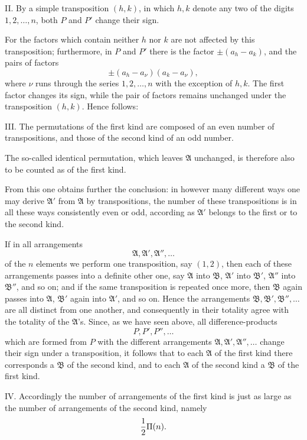 \documentclass[11pt]{article}
\begin{document}
II. By a simple transposition \((h,k)\), in which \(h,k\) denote any two of the digits \(1,2,\ldots,n\), both \(P\) and \(P'\) change their sign.

For the factors which contain neither \(h\) nor \(k\) are not affected by this transposition; furthermore, in \(P\) and \(P'\) there is the factor \(\pm(a_h-a_k)\), and the pairs of factors
\[
 \pm(a_h-a_\nu)(a_k-a_\nu),
\]
where \(\nu\) runs through the series \(1,2,\ldots,n\) with the exception of \(h,k\). The first factor changes its sign, while the pair of factors remains unchanged under the transposition \((h,k)\). Hence follows:

III. The permutations of the first kind are composed of an even number of transpositions, and those of the second kind of an odd number.

The so-called identical permutation, which leaves \(\mathfrak A\) unchanged, is therefore also to be counted as of the first kind.

From this one obtains further the conclusion: in however many different ways one may derive \(\mathfrak A'\) from \(\mathfrak A\) by transpositions, the number of these transpositions is in all these ways consistently even or odd, according as \(\mathfrak A'\) belongs to the first or to the second kind.

If in all arrangements
\[
 \mathfrak A,\mathfrak A',\mathfrak A'',\ldots
\]
of the \(n\) elements we perform one transposition, say \((1,2)\), then each of these arrangements passes into a definite other one, say \(\mathfrak A\) into \(\mathfrak B\), \(\mathfrak A'\) into \(\mathfrak B'\), \(\mathfrak A''\) into \(\mathfrak B''\), and so on; and if the same transposition is repeated once more, then \(\mathfrak B\) again passes into \(\mathfrak A\), \(\mathfrak B'\) again into \(\mathfrak A'\), and so on. Hence the arrangements \(\mathfrak B,\mathfrak B',\mathfrak B'',\ldots\) are all distinct from one another, and consequently in their totality agree with the totality of the \(\mathfrak A\)'s. Since, as we have seen above, all difference-products
\[
 P,P',P'',\ldots
\]
which are formed from \(P\) with the different arrangements \(\mathfrak A,\mathfrak A',\mathfrak A'',\ldots\) change their sign under a transposition, it follows that to each \(\mathfrak A\) of the first kind there corresponds a \(\mathfrak B\) of the second kind, and to each \(\mathfrak A\) of the second kind a \(\mathfrak B\) of the first kind.

IV. Accordingly the number of arrangements of the first kind is just as large as the number of arrangements of the second kind, namely
\[
 {1\over2}\Pi(n).
\]
\end{document}
